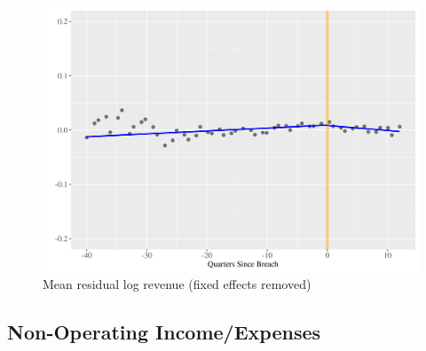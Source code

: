 \documentclass[../Main.tex]{subfiles}
\begin{document}
\FloatBarrier

\begin{figure}
    \centering
    \caption{Mean residual log revenue (fixed effects removed)}
    \label{logrevfig}
    \includegraphics[width=\textwidth]{Images/mean_resid_logrevenue_3y.png}
\end{figure}


\FloatBarrier
\clearpage

\subsection{Non-Operating Income/Expenses}
\end{document}
